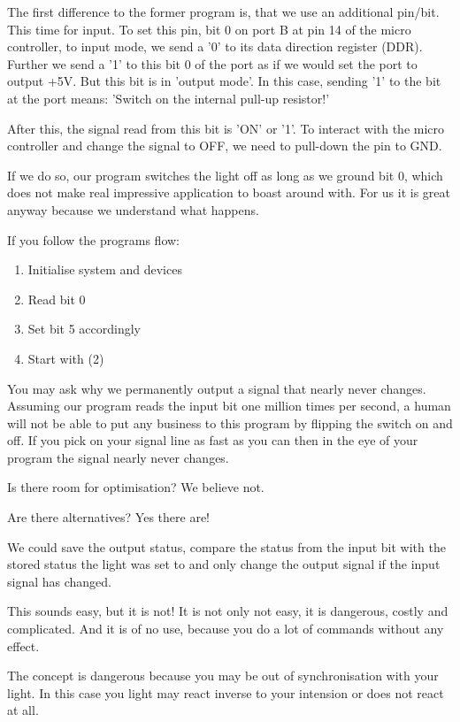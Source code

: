 The first difference to the former program is, that we use an additional pin/bit. This time for input. To set this pin, bit 0 on port B at pin 14 of the micro controller, to input mode, we send a '0' to its data direction register (DDR). Further we send a '1' to this bit 0 of the port as if we would set the port to output +5V. But this bit is in 'output mode'. In this case, sending '1' to the bit at the port means: 'Switch on the internal pull-up resistor!'

After this, the signal read from this bit is 'ON' or '1'. To interact with the micro controller and change the signal to OFF, we need to pull-down the pin to GND.

If we do so, our program switches the light off as long as we ground bit 0, which does not make real impressive application to boast around with. For us it is great anyway because we understand what happens.

If you follow the programs flow:

\begin{enumerate}
  \item Initialise system and devices
  \item Read bit 0
  \item Set bit 5 accordingly
  \item Start with (2)
\end{enumerate}

You may ask why we permanently output a signal that nearly never changes. Assuming our program reads the input bit one million times per second, a human will not be able to put any business to this program by flipping the switch on and off. If you pick on your signal line as fast as you can then in the eye of your program the signal nearly never changes.

Is there room for optimisation? We believe not.

Are there alternatives? Yes there are!

We could save the output status, compare the status from the input bit with the stored status the light was set to and only change the output signal if the input signal has changed.

This sounds easy, but it is not! It is not only not easy, it is dangerous, costly and complicated. And it is of no use, because you do a lot of commands without any effect.

The concept is dangerous because you may be out of synchronisation with your light. In this case you light may react inverse to your intension or does not react at all.

